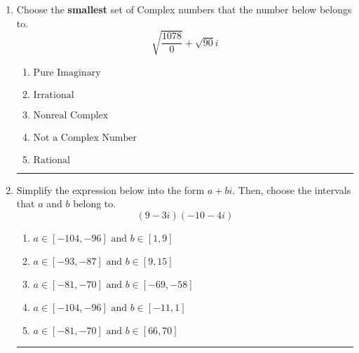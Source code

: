 \documentclass[14pt]{extbook}
\newcommand{\litem}[1]{\item#1\hspace*{-1cm}\rule{\textwidth}{0.4pt}}
\begin{document}
\begin{enumerate}
{\begin{enumerate}[label=\Alph*.]
\end{enumerate} }
\litem{
Choose the \textbf{smallest} set of Complex numbers that the number below belongs to.\[ \sqrt{\frac{1078}{0}}+\sqrt{90} i \]\begin{enumerate}[label=\Alph*.]
\item \( \text{Pure Imaginary} \)
\item \( \text{Irrational} \)
\item \( \text{Nonreal Complex} \)
\item \( \text{Not a Complex Number} \)
\item \( \text{Rational} \)

\end{enumerate} }
\litem{
Simplify the expression below into the form $a+bi$. Then, choose the intervals that $a$ and $b$ belong to.\[ (9 - 3 i)(-10 - 4 i) \]\begin{enumerate}[label=\Alph*.]
\item \( a \in [-104, -96] \text{ and } b \in [1, 9] \)
\item \( a \in [-93, -87] \text{ and } b \in [9, 15] \)
\item \( a \in [-81, -70] \text{ and } b \in [-69, -58] \)
\item \( a \in [-104, -96] \text{ and } b \in [-11, 1] \)
\item \( a \in [-81, -70] \text{ and } b \in [66, 70] \)

\end{enumerate} }
\end{enumerate}
\end{document}
